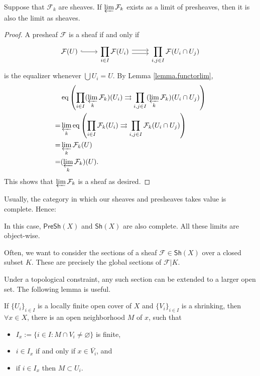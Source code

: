\begin{proposition}\label{prop.sheaflim}
    Suppose that $\mathcal{F}_k$ are sheaves. If $\varprojlim\mathcal{F}_k$ exists as a limit of presheaves, then it is also the limit as sheaves.
\end{proposition}

\begin{proof}
    A presheaf $\mathcal{F}$ is a sheaf if and only if
    \[\begin{tikzcd}
        \mathcal{F}(U) \arrow[r, hook] & \displaystyle\prod_{i\in I}\mathcal{F}(U_i) \arrow[r, shift left=1] \arrow[r, shift right=1] & \displaystyle\prod_{i,j\in I}\mathcal{F}(U_i\cap U_j)
    \end{tikzcd}\]
    is the equalizer whenever $\bigcup U_i=U$. By Lemma \ref{lemma.functorlim},
    \begin{align*}
        & \operatorname{eq}\left(\prod_{i\in I}(\varprojlim_k\mathcal{F}_k)(U_i)\rightrightarrows\prod_{i,j\in I}(\varprojlim_k\mathcal{F}_k)(U_i\cap U_j)\right) \\
        = & \varprojlim_k \operatorname{eq}\left(\prod_{i\in I}\mathcal{F}_k(U_i)\rightrightarrows\prod_{i,j\in I}\mathcal{F}_k(U_i\cap U_j)\right) \\
        = & \varprojlim_k\mathcal{F}_k(U) \\
        = & (\varprojlim_k\mathcal{F}_k)(U).
    \end{align*}
    This shows that $\varprojlim\mathcal{F}_k$ is a sheaf as desired.
\end{proof}

Usually, the category in which our sheaves and presheaves takes value is complete. Hence:

\begin{corollary}
    In this case, $\mathsf{PreSh}(X)$ and $\mathsf{Sh}(X)$ are also complete. All these limits are object-wise.
\end{corollary}

Often, we want to consider the sections of a sheaf $\mathcal{F}\in\mathsf{Sh}(X)$ over a closed subset $K$. These are precisely the global sections of $\mathcal{F}|K$. 

Under a topological constraint, any such section can be extended to a larger open set. The following lemma is useful.

\begin{lemma}\label{lemma.shrknhood}
    If $\{U_i\}_{i\in I}$ is a locally finite open cover of $X$ and $\{V_i\}_{i\in I}$ is a shrinking, then $\forall x\in X$, there is an open neighborhood $M$ of $x$, such that
    \begin{itemize}
        \item $I_x:=\{i\in I:M\cap V_i\neq\varnothing\}$ is finite,
        \item $i\in I_x$ if and only if $x\in\overline{V_i}$, and
        \item if $i\in I_x$ then $M\subset U_i$.
    \end{itemize}
\end{lemma}

